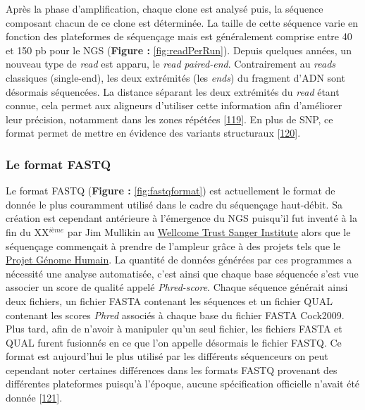 \documentclass[12pt,twoside]{reedthesis}
\theoremstyle{definition}
\theoremstyle{definition}
\theoremstyle{remark}
\begin{document}
  Après la phase d'amplification, chaque clone est analysé puis, la
  séquence composant chacun de ce clone est déterminée. La taille de cette
  séquence varie en fonction des plateformes de séquençage mais est
  généralement comprise entre 40 et 150 pb pour le NGS (\textbf{Figure :
  }\ref{fig:readPerRun}). Depuis quelques années, un nouveau type de
  \emph{read} est apparu, le \emph{read} \emph{paired-end}. Contrairement
  au \emph{reads} classiques (single-end), les deux extrémités (les
  \emph{ends}) du fragment d'ADN sont désormais séquencées. La distance
  séparant les deux extrémités du \emph{read} étant connue, cela permet
  aux aligneurs d'utiliser cette information afin d'améliorer leur
  précision, notamment dans les zones répétées
  {[}\protect\hyperlink{ref-Li2008}{119}{]}. En plus de SNP, ce format
  permet de mettre en évidence des variants structuraux
  {[}\protect\hyperlink{ref-Korbel2009}{120}{]}.
  
  \newpage
  
  \subsubsection{Le format FASTQ}\label{fastq}
  
  Le format FASTQ (\textbf{Figure : }\ref{fig:fastqformat}) est
  actuellement le format de donnée le plus couramment utilisé dans le
  cadre du séquençage haut-débit. Sa création est cependant antérieure à
  l'émergence du NGS puisqu'il fut inventé à la fin du XX\(^{ième}\) par
  Jim Mullikin au
  \href{https://fr.wikipedia.org/wiki/Wellcome_Trust_Sanger_Institute}{Wellcome
  Trust Sanger Institute} alors que le séquençage commençait à prendre de
  l'ampleur grâce à des projets tels que le
  \href{https://fr.wikipedia.org/wiki/Projet_G\%C3\%A9nome_Humain}{Projet
  Génome Humain}. La quantité de données générées par ces programmes a
  nécessité une analyse automatisée, c'est ainsi que chaque base séquencée
  s'est vue associer un score de qualité appelé \emph{Phred-score}. Chaque
  séquence générait ainsi deux fichiers, un fichier FASTA contenant les
  séquences et un fichier QUAL contenant les scores \emph{Phred} associés
  à chaque base du fichier FASTA Cock2009. Plus tard, afin de n'avoir à
  manipuler qu'un seul fichier, les fichiers FASTA et QUAL furent
  fusionnés en ce que l'on appelle désormais le fichier FASTQ. Ce format
  est aujourd'hui le plus utilisé par les différents séquenceurs on peut
  cependant noter certaines différences dans les formats FASTQ provenant
  des différentes plateformes puisqu'à l'époque, aucune spécification
  officielle n'avait été donnée
  {[}\protect\hyperlink{ref-Cock2009}{121}{]}.
  
\end{document}
